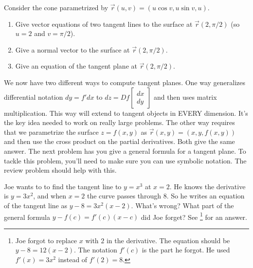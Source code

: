 \begin{problem}%
%
 Consider the cone parametrized by $\vec r(u,v)=(u\cos v, u\sin v,u)$.
 \begin{enumerate}
 \item Give vector equations of two tangent lines to the surface at $\vec r(2,\pi/2)$ (so $u=2$ and $v=\pi/2$).
 \item Give a normal vector to the surface at $\vec r(2,\pi/2)$.
 \item Give an equation of the tangent plane at $\vec r(2,\pi/2)$.
 \end{enumerate}
\end{problem}


We now have two different ways to compute tangent planes.  One way generalizes differential notation $dy=f'dx$ to 
$dz = Df \begin{bmatrix}dx\\dy\end{bmatrix}$ and then uses matrix multiplication. This way will extend to tangent objects in EVERY dimension.  It's the key idea needed to work on really large problems.  The other way requires that we parametrize the surface $z=f(x,y)$ as $\vec r(x,y)=(x,y,f(x,y))$ and then use the cross product on the partial derivatives. Both give the same answer. The next problem has you give a general formula for a tangent plane.  To tackle this problem, you'll need to make sure you can use symbolic notation.  The review problem should help with this.

\begin{review*}
 Joe wants to to find the tangent line to $y=x^3$ at $x=2$.  He knows the derivative is $y=3x^2$, and when $x=2$ the curve passes through $8$.  So he writes an equation of the tangent line as $y-8=3x^2(x-2)$.  What's wrong?  What part of the general formula $y-f(c) = f'(c) (x-c)$ did Joe forget?  See \footnote{Joe forgot to replace $x$ with $2$ in the derivative. The equation should be $y-8=12(x-2)$.  The notation $f'(c)$ is the part he forgot.  He used $f'(x)=3x^2$ instead of $f'(2)=8$.} for an answer.

\end{review*}



